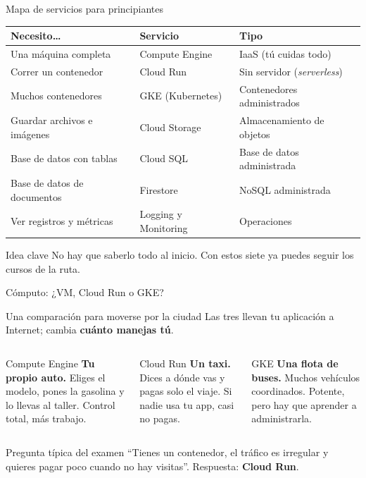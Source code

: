 \documentclass[aspectratio=169,10pt,c]{beamer}
\begin{document}
\begin{frame}{Mapa de servicios para principiantes}
\renewcommand{\arraystretch}{1.2}
\centering\small
\begin{tabular}{@{}p{4.2cm}p{4.2cm}p{4.4cm}@{}}
\toprule
\textbf{Necesito\ldots} & \textbf{Servicio} & \textbf{Tipo}\\
\midrule
Una máquina completa & Compute Engine & IaaS (tú cuidas todo)\\
Correr un contenedor & Cloud Run & Sin servidor (\emph{serverless})\\
Muchos contenedores & GKE (Kubernetes) & Contenedores administrados\\
Guardar archivos e imágenes & Cloud Storage & Almacenamiento de objetos\\
Base de datos con tablas & Cloud SQL & Base de datos administrada\\
Base de datos de documentos & Firestore & NoSQL administrada\\
Ver registros y métricas & Logging y Monitoring & Operaciones\\
\bottomrule
\end{tabular}
\par\vspace{3mm}
\begin{block}{Idea clave}
\small No hay que saberlo todo al inicio. Con estos siete ya puedes seguir los cursos de la ruta.
\end{block}
\end{frame}

\begin{frame}{Cómputo: ¿VM, Cloud Run o GKE?}
\begin{block}{Una comparación para moverse por la ciudad}
\small Las tres llevan tu aplicación a Internet; cambia \textbf{cuánto manejas tú}.
\end{block}
\begin{columns}[T,onlytextwidth]
\begin{exampleblock}{Compute Engine}
\small \textbf{Tu propio auto.} Eliges el modelo, pones la gasolina y lo llevas al taller. Control total, más trabajo.
\end{exampleblock}
\begin{exampleblock}{Cloud Run}
\small \textbf{Un taxi.} Dices a dónde vas y pagas solo el viaje. Si nadie usa tu app, casi no pagas.
\end{exampleblock}
\begin{exampleblock}{GKE}
\small \textbf{Una flota de buses.} Muchos vehículos coordinados. Potente, pero hay que aprender a administrarla.
\end{exampleblock}
\end{columns}
\par\vspace{2mm}
\begin{alertblock}{Pregunta típica del examen}
\small ``Tienes un contenedor, el tráfico es irregular y quieres pagar poco cuando no hay visitas''. Respuesta: \textbf{Cloud Run}.
\end{alertblock}
\end{frame}
\end{document}
